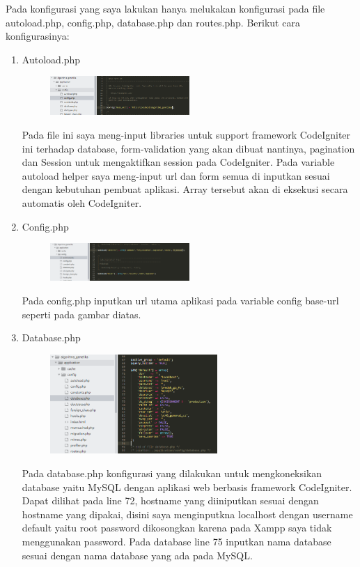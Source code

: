 Pada konfigurasi yang saya lakukan hanya melukakan konfigurasi pada file autoload.php, config.php, database.php dan routes.php. Berikut cara konfigurasinya:
\begin{enumerate}
    \item Autoload.php
		\begin{figure}[!htbp]
    		\centering
    		\includegraphics[width=0.5\textwidth]{figures/CodeIgniter2.PNG}
    		\label{CodeIgniter2}
		\end{figure}
		\par Pada file ini saya meng-input libraries untuk support framework CodeIgniter ini terhadap database, form-validation yang akan dibuat nantinya, pagination dan Session untuk mengaktifkan session pada CodeIgniter.
        Pada variable autoload helper saya meng-input url dan form semua di inputkan sesuai dengan kebutuhan pembuat aplikasi. Array tersebut akan di eksekusi secara automatis oleh CodeIgniter.

    \item Config.php
		\begin{figure}[!htbp]
    		\centering
    		\includegraphics[width=0.5\textwidth]{figures/CodeIgniter3.PNG}
    		\label{CodeIgniter3}
		\end{figure}
        \par Pada config.php inputkan url utama aplikasi pada variable config base-url seperti pada gambar diatas.
        
    \item Database.php
		\begin{figure}[!htbp]
    		\centering
    		\includegraphics[width=0.6\textwidth]{figures/CodeIgniter4.PNG}
    		\label{CodeIgniter4}
		\end{figure}
		\par Pada database.php konfigurasi yang dilakukan untuk mengkoneksikan database yaitu MySQL dengan aplikasi web berbasis framework CodeIgniter. Dapat dilihat pada line 72, hostname yang diiniputkan sesuai dengan hostname yang dipakai, disini saya menginputkna localhost dengan username default yaitu root password dikosongkan karena pada Xampp saya tidak menggunakan password. Pada database line 75 inputkan nama database sesuai dengan nama database yang ada pada MySQL.
		

\end{enumerate}
